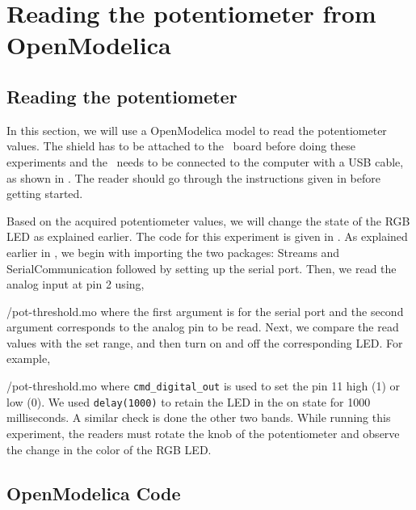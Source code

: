 \section{Reading the potentiometer from OpenModelica}
\subsection{Reading the potentiometer}
In this section, we will use a OpenModelica model to read the potentiometer values.  
The shield has to be attached to the \arduino\ board
before doing these experiments and the \arduino\ needs to be connected to the computer 
with a USB cable, as shown in .
The reader should go through the instructions given in
 before getting started.

Based on the acquired potentiometer values, we will change the state of the 
RGB LED as explained earlier. The code for this experiment is given in
. As explained earlier in , 
  we begin with importing the two packages: Streams and SerialCommunication followed 
  by setting up the serial port. Then, we read the analog input at pin 2 using,

{\LocPotOpenModelicacode/pot-threshold.mo} where the first argument is for
the serial port and the second argument corresponds to the analog pin to be read.  Next, we compare the read values with the set range, and then turn on and off the corresponding LED. For example, 

{\LocPotOpenModelicacode/pot-threshold.mo} 
where {\tt cmd\_digital\_out} is used to set the pin 11 high (1) or low (0). 
We used {\tt delay(1000)} to retain the LED in the on state for 1000 milliseconds.  
A similar check is done the other two bands. 
While running this experiment, 
the readers must rotate the knob of the potentiometer and observe 
the change in the color of the RGB LED.
\subsection{OpenModelica Code}
\label{sec:pot-OpenModelica-code}
\begin{OpenModelicacode}
\label{OpenModelica:pot-100}

\end{OpenModelicacode}
